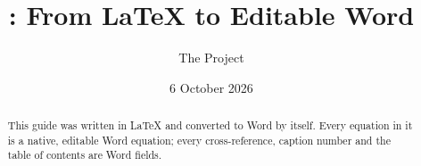 
\pagestyle{fancy}
\fancyhf{}
\fancyhead[R]{\leftmark}
\title{\texdocx: From \LaTeX{} to Editable Word}
\author{The \texdocx{} Project}
\date{6 October 2026}

\maketitle
\begin{abstract}
This guide was written in \LaTeX{} and converted to Word by \texdocx{} itself.
Every equation in it is a native, editable Word equation; every cross-reference,
caption number and the table of contents are Word fields.
\end{abstract}
\tableofcontents







